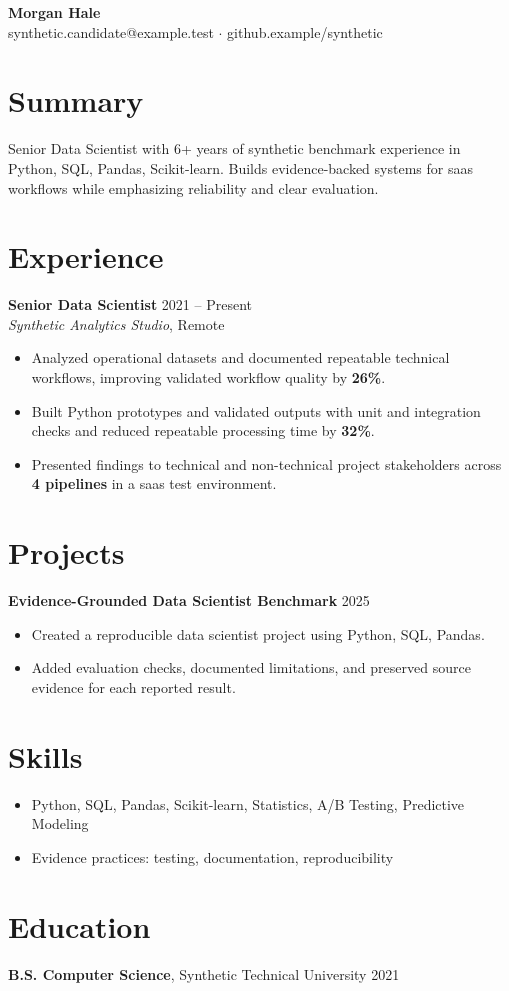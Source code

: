 \documentclass[10pt,letterpaper]{article}
\newcommand{\resumeItem}[1]{\item #1}
\newcommand{\resumeItemListStart}{\begin{itemize}[leftmargin=*]}
\newcommand{\resumeItemListEnd}{\end{itemize}}
\begin{document}
\begin{center}
{\Large \textbf{Morgan Hale}}\\
synthetic.candidate@example.test $\cdot$ github.example/synthetic
\end{center}

\section*{Summary}
Senior Data Scientist with 6+ years of synthetic benchmark experience in Python, SQL, Pandas, Scikit-learn. Builds evidence-backed systems for saas workflows while emphasizing reliability and clear evaluation.

\section*{Experience}
\textbf{Senior Data Scientist} \hfill 2021 -- Present\\
\textit{Synthetic Analytics Studio}, Remote
\resumeItemListStart
  \resumeItem{Analyzed operational datasets and documented repeatable technical workflows, improving validated workflow quality by \textbf{26\%}.}
  \resumeItem{Built Python prototypes and validated outputs with unit and integration checks and reduced repeatable processing time by \textbf{32\%}.}
  \resumeItem{Presented findings to technical and non-technical project stakeholders across \textbf{4 pipelines} in a saas test environment.}
\resumeItemListEnd

\section*{Projects}
\textbf{Evidence-Grounded Data Scientist Benchmark} \hfill 2025
\resumeItemListStart
  \resumeItem{Created a reproducible data scientist project using Python, SQL, Pandas.}
  \resumeItem{Added evaluation checks, documented limitations, and preserved source evidence for each reported result.}
\resumeItemListEnd

\section*{Skills}
\resumeItemListStart
  \resumeItem{Python, SQL, Pandas, Scikit-learn, Statistics, A/B Testing, Predictive Modeling}
  \resumeItem{Evidence practices: testing, documentation, reproducibility}
\resumeItemListEnd

\section*{Education}
\textbf{B.S. Computer Science}, Synthetic Technical University \hfill 2021
\end{document}
